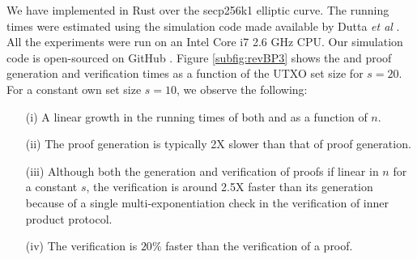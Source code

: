   We have implemented \RPlus in Rust over the secp256k1 elliptic curve. The \R running times were estimated using the simulation code made available by Dutta \textit{et al} \cite{RevelioPerfRepo}.
  All the experiments were run on an Intel Core i7 2.6 GHz CPU.
  Our simulation code is open-sourced on GitHub \cite{RevelioBPPerfRepo}. 
  Figure \ref{subfig:revBP3} shows the \RPlus and \R proof generation and verification times as a function of the UTXO set size for $s=20$.
  For a constant own set size $s=10$, we observe the following:
  \begin{enumerate}
    \item[(i)] A linear growth in the running times of both \RB and \R as a function of $n$.
    \item[(ii)] The \RB proof generation is typically 2X slower than that of \R proof generation.
    \item[(iii)] Although both the generation and verification of \RB proofs if linear in $n$ for a constant $s$, the verification is around 2.5X faster than its generation because of a single multi-exponentiation check in the verification of inner product protocol.
    \item[(iv)] The \RB verification is $20\%$ faster than the verification of a \R proof.
  \end{enumerate}
  
